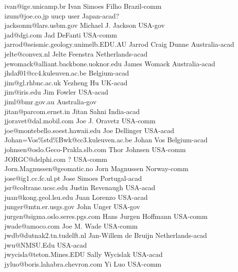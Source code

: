 \begin{tabbing}
ivan@ige.unicamp.br \> Ivan Simoes Filho \> Brazil-comm\\
izum@joe.co.jp \> uucp user \> Japan-acad?\\
jacksonm@lars.usbm.gov \> Michael J. Jackson \> USA-gov\\
jad@dgi.com \> Jad DeFanti \> USA-comm\\
jarrod@seismic.geology.unimelb.EDU.AU \> Jarrod Craig Dunne \> Australia-acad\\
jelte@convex.nl \> Jelte Feenstra \> Netherlands-acad\\
jewomack@alliant.backbone.uoknor.edu \> James Womack \> Australia-acad\\
jhdaf01@cc4.kuleuven.ac.be  \>  \>  Belgium-acad\\
jim@gl.rhbnc.ac.uk \> Yezheng Hu \> UK-acad\\
jim@iris.edu \> Jim Fowler \> USA-acad\\
jiml@bmr.gov.au  \>    \>  Australia-gov \\
jitan@parcom.ernet.in \> Jitan Sahni \> India-acad\\
jjoravet@dal.mobil.com \> Joe J. Oravetz \>  USA-comm\\
joe@montebello.soest.hawaii.edu \> Joe Dellinger \> USA-acad\\
Johan=Vos\%std\%Bwk@cc3.kuleuven.ac.be \> Johan Vos \> Belgium-acad\\
johnsen@oslo.Geco-Prakla.slb.com \> Thor Johnsen \> USA-comm\\
JORGC@delphi.com \> ? \> USA-comm\\
Jorn.Magnussen@geomatic.no \> Jorn Magnussen \> Norway-comm\\
jose@ig1.cc.fc.ul.pt \> Jose Simoes \> Portugal-acad\\
jsr@coltrane.ucsc.edu \> Justin Revenaugh \> USA-acad\\
juan@kong.geol.lsu.edu \> Juan Lorenzo \>  USA-acad\\
junger@mtn.er.usgs.gov \> John Unger \>  USA-gov\\
jurgen@sigma.oslo.seres.pgs.com \> Hans Jurgen Hoffmann \> USA-comm\\
jwade@amoco.com \>  Joe M. Wade \>  USA-comm\\
jwdb@dutnak2.tn.tudelft.nl \> Jan-Willem de Bruijn \> Netherlands-acad\\
jwu@NMSU.Edu \> \> USA-acad\\
jwycisla@teton.Mines.EDU \> Sally Wycislak \> USA-acad\\
jyluo@boris.lahabra.chevron.com \> Yi Luo \> USA-comm\\

\end{tabbing}
